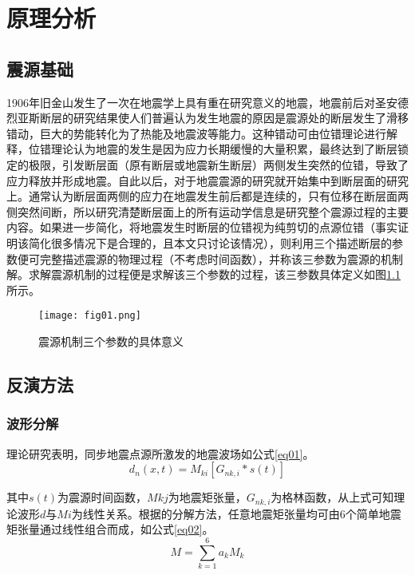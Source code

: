 

\chapter{原理分析}
\label{cha:intro}

\section{震源基础}
1906年旧金山发生了一次在地震学上具有重在研究意义的地震，地震前后对圣安德烈亚斯断层的研究结果\citep{Milne1910}使人们普遍认为发生地震的原因是震源处的断层发生了滑移错动，巨大的势能转化为了热能及地震波等能力。这种错动可由位错理论进行解释，位错理论认为地震的发生是因为应力长期缓慢的大量积累，最终达到了断层锁定的极限，引发断层面（原有断层或地震新生断层）两侧发生突然的位错，导致了应力释放并形成地震。自此以后，对于地震震源的研究就开始集中到断层面的研究上。通常认为断层面两侧的应力在地震发生前后都是连续的，只有位移在断层面两侧突然间断，所以研究清楚断层面上的所有运动学信息是研究整个震源过程的主要内容。如果进一步简化，将地震发生时断层的位错视为纯剪切的点源位错（事实证明该简化很多情况下是合理的，且本文只讨论该情况），则利用三个描述断层的参数便可完整描述震源的物理过程（不考虑时间函数），并称该三参数为震源的机制解。求解震源机制的过程便是求解该三个参数的过程，该三参数具体定义如图\ref{fig01}所示\citep{程万正2006}。
\begin{figure}
\centering
  \texttt{[image: fig01.png]} 
  \caption{震源机制三个参数的具体意义}
  \label{fig01}
\end{figure}

\section{反演方法}
\subsection{波形分解}
理论研究表明，同步地震点源\citep{Silver1982}所激发的地震波场如公式\ref{eq01}\citep{Jost1989}。
\begin{equation}
\label{eq01}
d_n(x,t)=M_{ki}[G_{nk,i}*s(t)]
\end{equation}

其中$s(t)$为震源时间函数，$Mkj$为地震矩张量，$G_{nk,i}$为格林函数，从上式可知理论波形$d$与$Mi$为线性关系。根据\citet{Kikuchi1991}的分解方法，任意地震矩张量均可由6个简单地震矩张量通过线性组合而成，如公式\ref{eq02}。
\begin{equation}
\label{eq02}
M=\sum_{k=1}^6a_kM_k
\end{equation}

